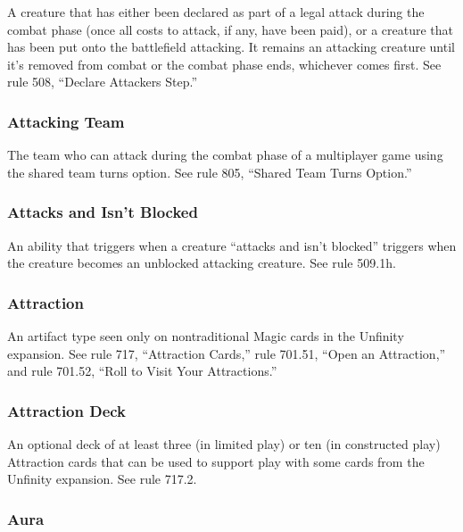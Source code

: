 {A creature that has either been declared as part of a legal attack during the combat phase (once all costs to attack, if any, have been paid), or a creature that has been put onto the battlefield attacking. It remains an attacking creature until it’s removed from combat or the combat phase ends, whichever comes first. See rule 508, “Declare Attackers Step.”

\subsubsection*{Attacking Team}

The team who can attack during the combat phase of a multiplayer game using the shared team turns option. See rule 805, “Shared Team Turns Option.”

\subsubsection*{Attacks and Isn’t Blocked}

An ability that triggers when a creature “attacks and isn’t blocked” triggers when the creature becomes an unblocked attacking creature. See rule 509.1h.

\subsubsection*{Attraction}

An artifact type seen only on nontraditional Magic cards in the Unfinity expansion. See rule 717, “Attraction Cards,” rule 701.51, “Open an Attraction,” and rule 701.52, “Roll to Visit Your Attractions.”

\subsubsection*{Attraction Deck}

An optional deck of at least three (in limited play) or ten (in constructed play) Attraction cards that can be used to support play with some cards from the Unfinity expansion. See rule 717.2.

\subsubsection*{Aura}

}

